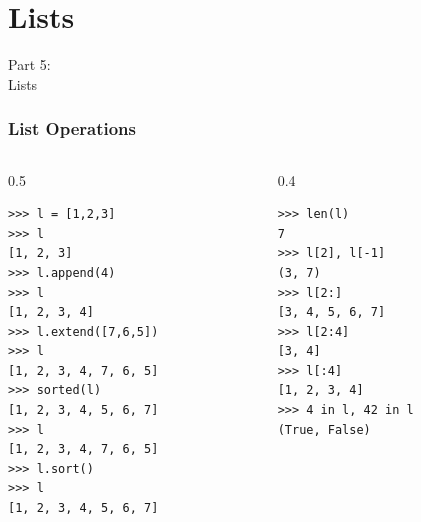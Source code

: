 {
\renewcommand{\bgcolor}{lists}

\section{Lists}
\begin{frame}
    \vspace{25mm}
    \begin{center}
        \Huge{Part 5:\\Lists}
    \end{center}
\end{frame}

\begin{frame}[fragile]
  \frametitle{List Operations}
  \vspace{-3mm}
  \begin{columns}
    \begin{column}{0.5\textwidth}
      \begin{verbatim}
>>> l = [1,2,3]
>>> l
[1, 2, 3]
>>> l.append(4)
>>> l
[1, 2, 3, 4]
>>> l.extend([7,6,5])
>>> l
[1, 2, 3, 4, 7, 6, 5]
>>> sorted(l)
[1, 2, 3, 4, 5, 6, 7]
>>> l
[1, 2, 3, 4, 7, 6, 5]
>>> l.sort()
>>> l
[1, 2, 3, 4, 5, 6, 7]
      \end{verbatim}
    \end{column}
    \begin{column}{0.4\textwidth}
      \begin{verbatim}
>>> len(l)
7
>>> l[2], l[-1]
(3, 7)
>>> l[2:]
[3, 4, 5, 6, 7]
>>> l[2:4]
[3, 4]
>>> l[:4]
[1, 2, 3, 4]
>>> 4 in l, 42 in l
(True, False)
      \end{verbatim}
    \end{column}
  \end{columns}
\end{frame}

}


